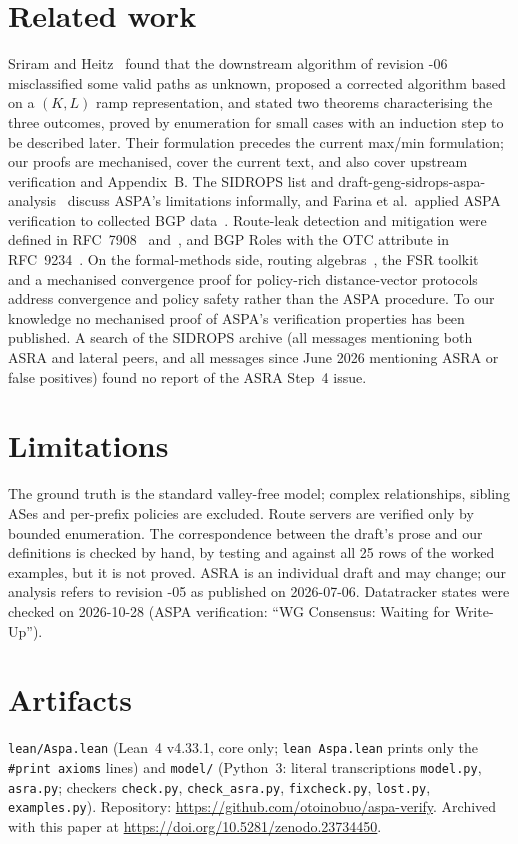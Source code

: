 \documentclass[11pt,a4paper]{article}
\theoremstyle{definition}
\theoremstyle{remark}
\newcommand{\lean}[1]{\texttt{#1}}
\begin{document}
\section{Related work}
Sriram and Heitz~\cite{sriram-heitz} found that the downstream algorithm of revision -06 misclassified
some valid paths as unknown, proposed a corrected algorithm based on a $(K,L)$ ramp representation, and
stated two theorems characterising the three outcomes, proved by enumeration for small cases with an
induction step to be described later. Their formulation precedes the current max/min formulation; our
proofs are mechanised, cover the current text, and also cover upstream verification and Appendix~B.
The SIDROPS list and draft-geng-sidrops-aspa-analysis~\cite{geng} discuss ASPA's limitations informally,
and Farina et al.\ applied ASPA verification to collected BGP data~\cite{first-look}. Route-leak detection and
mitigation were defined in RFC~7908~\cite{rfc7908} and~\cite{route-leak-dm}, and BGP Roles with the OTC
attribute in RFC~9234~\cite{rfc9234}. On the formal-methods side, routing algebras~\cite{sobrinho,metarouting},
the FSR toolkit~\cite{fsr} and a mechanised convergence proof for policy-rich distance-vector
protocols~\cite{daggitt} address convergence and policy safety rather than the ASPA procedure. To our
knowledge no mechanised proof of ASPA's verification properties has been published. A search of the
SIDROPS archive (all messages mentioning both ASRA and lateral peers, and all messages since June 2026
mentioning ASRA or false positives) found no report of the ASRA Step~4 issue.

\section{Limitations}
The ground truth is the standard valley-free model; complex relationships, sibling ASes and per-prefix
policies are excluded. Route servers are verified only by bounded enumeration. The correspondence between
the draft's prose and our definitions is checked by hand, by testing and against all 25 rows of the
worked examples, but it is not proved. ASRA is an individual draft and may change; our analysis refers to
revision -05 as published on 2026-07-06. Datatracker states were checked on 2026-10-28
(ASPA verification: ``WG Consensus: Waiting for Write-Up'').

\section*{Artifacts}
\lean{lean/Aspa.lean} (Lean~4 v4.33.1, core only; \lean{lean Aspa.lean} prints only the
\lean{\#print axioms} lines) and \lean{model/} (Python~3: literal transcriptions \lean{model.py},
\lean{asra.py}; checkers \lean{check.py}, \lean{check\_asra.py}, \lean{fixcheck.py}, \lean{lost.py},
\lean{examples.py}).
Repository: \url{https://github.com/otoinobuo/aspa-verify}. Archived with this paper at \url{https://doi.org/10.5281/zenodo.23734450}.
\end{document}
